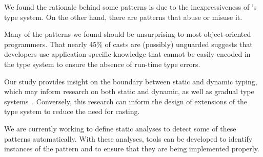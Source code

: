 We found the rationale behind some patterns is due to the inexpressiveness of \java{}'s type system.
On the other hand,
there are patterns that abuse or misuse it.

Many of the patterns we found should be unsurprising to most object-oriented programmers.
That nearly 45\% of casts are (possibly) unguarded 
suggests that developers use application-specific knowledge that cannot be easily encoded in
the type system to ensure the absence of run-time type errors.

Our study provides insight on the boundary between static and dynamic typing,
which may inform research on both static and dynamic,
as well as gradual type systems~\citep{Siek06gradualtyping}.
Conversely, this research can inform the design of extensions of the \java{} type system to reduce the need for casting.

We are currently working to define static analyses to detect some of these patterns automatically.
With these analyses,
tools can be developed to identify instances of the pattern and to ensure that they are being implemented properly.
